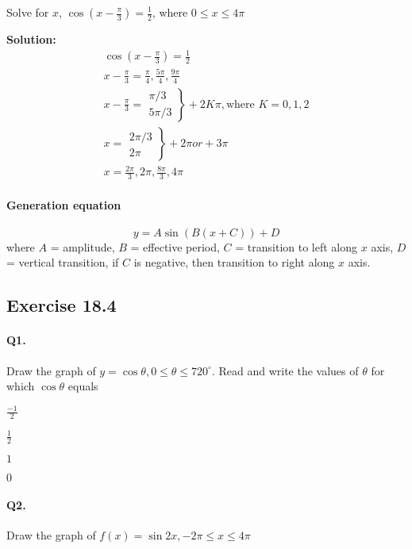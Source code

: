 \documentclass{article}
\begin{document}
Solve for $x$, $\cos(x-\frac{\pi}{3}) = \frac{1}{2}$, where $0 \leq x \leq 4\pi$

{\scriptsize \textbf{Solution:}}
\[
  \begin{aligned}
    \cos(x-\frac{\pi}{3}) = \frac{1}{2} \\
    x - \frac{\pi}{3} = \frac{\pi}{4}, \frac{5\pi}{4}, \frac{9\pi}{4} \\
    x - \frac{\pi}{3} = \left. \begin{array}{c} \pi/3 \\ 5\pi/3 \end{array} \right\} + 2K\pi, \text{where } K = 0, 1, 2 \\
    x = \left. \begin{array}{c} 2\pi/3 \\ 2\pi \end{array} \right\} + 2\pi or + 3\pi \\
    x = \frac{2\pi}{3}, 2\pi, \frac{8\pi}{3}, 4\pi
  \end{aligned}
\]

\paragraph{Generation equation}
\[ y = A \sin(B(x + C)) + D \] where $A$ = amplitude, $B$ = effective period, $C$ = transition to left along $x$ axis, $D$ = vertical transition, if $C$ is negative, then transition to right along $x$ axis.

\subsection {Exercise 18.4}
\paragraph{Q1.}
Draw the graph of $y=\cos\theta, 0 \leq \theta \leq 720^{\circ}$.
Read and write the values of $\theta$ for which $\cos\theta$ equals

\begin{enumerate*}[label=\alph*)]
  \item $\frac{-1}{2}$
  \item $\frac{1}{2}$
  \item $1$
  \item $0$
\end{enumerate*}

\paragraph{Q2.}
Draw the graph of $f(x)=\sin 2x, -2\pi \leq x \leq 4\pi$
\end{document}
